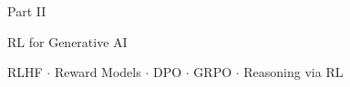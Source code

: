 \documentclass[aspectratio=169]{beamer}
\begin{document}
\begin{frame}
\begin{center}
\vspace{2cm}
{\Huge \textcolor{popblue}{Part II}}

\vspace{0.5cm}
{\Large RL for Generative AI}

\vspace{0.3cm}
{\normalsize RLHF $\cdot$ Reward Models $\cdot$ DPO $\cdot$ GRPO $\cdot$ Reasoning via RL}
\end{center}
\end{frame}

\end{document}
